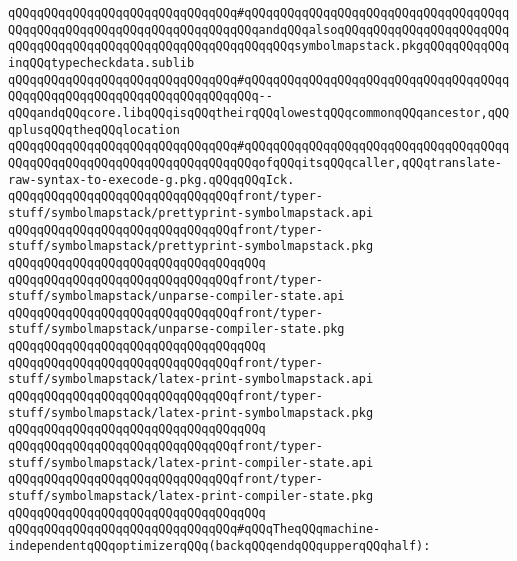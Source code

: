 \verb|qQQqqQQqqQQqqQQqqQQqqQQqqQQqqQQq#qQQqqQQqqQQqqQQqqQQqqQQqqQQqqQQqqQQqqQQqqQQqqQQqqQQqqQQqqQQqqQQqqQQqqQQqandqQQqalsoqQQqqQQqqQQqqQQqqQQqqQQqqQQqqQQqqQQqqQQqqQQqqQQqqQQqqQQqqQQqqQQqsymbolmapstack.pkgqQQqqQQqqQQqinqQQqtypecheckdata.sublib|\newline
\verb|qQQqqQQqqQQqqQQqqQQqqQQqqQQqqQQq#qQQqqQQqqQQqqQQqqQQqqQQqqQQqqQQqqQQqqQQqqQQqqQQqqQQqqQQqqQQqqQQqqQQqqQQq--qQQqandqQQqcore.libqQQqisqQQqtheirqQQqlowestqQQqcommonqQQqancestor,qQQqplusqQQqtheqQQqlocation|\newline
\verb|qQQqqQQqqQQqqQQqqQQqqQQqqQQqqQQq#qQQqqQQqqQQqqQQqqQQqqQQqqQQqqQQqqQQqqQQqqQQqqQQqqQQqqQQqqQQqqQQqqQQqqQQqofqQQqitsqQQqcaller,qQQqtranslate-raw-syntax-to-execode-g.pkg.qQQqqQQqIck.|\newline
\verb|qQQqqQQqqQQqqQQqqQQqqQQqqQQqqQQqfront/typer-stuff/symbolmapstack/prettyprint-symbolmapstack.api|\newline
\verb|qQQqqQQqqQQqqQQqqQQqqQQqqQQqqQQqfront/typer-stuff/symbolmapstack/prettyprint-symbolmapstack.pkg|\newline
\verb|qQQqqQQqqQQqqQQqqQQqqQQqqQQqqQQqqQQq|\newline
\verb|qQQqqQQqqQQqqQQqqQQqqQQqqQQqqQQqfront/typer-stuff/symbolmapstack/unparse-compiler-state.api|\newline
\verb|qQQqqQQqqQQqqQQqqQQqqQQqqQQqqQQqfront/typer-stuff/symbolmapstack/unparse-compiler-state.pkg|\newline
\verb|qQQqqQQqqQQqqQQqqQQqqQQqqQQqqQQqqQQq|\newline
\verb|qQQqqQQqqQQqqQQqqQQqqQQqqQQqqQQqfront/typer-stuff/symbolmapstack/latex-print-symbolmapstack.api|\newline
\verb|qQQqqQQqqQQqqQQqqQQqqQQqqQQqqQQqfront/typer-stuff/symbolmapstack/latex-print-symbolmapstack.pkg|\newline
\verb|qQQqqQQqqQQqqQQqqQQqqQQqqQQqqQQqqQQq|\newline
\verb|qQQqqQQqqQQqqQQqqQQqqQQqqQQqqQQqfront/typer-stuff/symbolmapstack/latex-print-compiler-state.api|\newline
\verb|qQQqqQQqqQQqqQQqqQQqqQQqqQQqqQQqfront/typer-stuff/symbolmapstack/latex-print-compiler-state.pkg|\newline
\verb|qQQqqQQqqQQqqQQqqQQqqQQqqQQqqQQqqQQq|\newline
\newline
\newline
\verb|qQQqqQQqqQQqqQQqqQQqqQQqqQQqqQQq#qQQqTheqQQqmachine-independentqQQqoptimizerqQQq(backqQQqendqQQqupperqQQqhalf):|\newline
